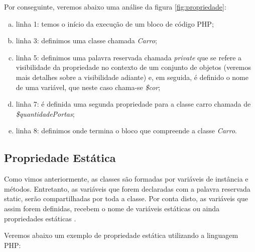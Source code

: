 Por conseguinte, veremos abaixo uma análise da figura \ref{fig:propriedade}:

\begin{enumerate}[a)]
    \item linha 1: temos o início da execução de um bloco de código PHP;
    \item linha 3: definimos uma classe chamada \textit{Carro};
    \item linha 5: definimos uma palavra reservada chamada
    \textit{private} que se refere a visibilidade da propriedade no contexto  de
    um conjunto de objetos (veremos mais detalhes sobre a visibilidade adiante) 
    e, em seguida, é definido o nome de uma variável, que neste caso chama-se
    \textit{\$cor};
    \item linha 7: é definida uma segunda propriedade para a classe
    carro chamada de \textit{\$quantidadePortas};
    \item linha 8: definimos onde termina o bloco que compreende a
    classe \textit{Carro}.
\end{enumerate}

\subsection{Propriedade Estática}

Como vimos anteriormente, as classes são formadas por variáveis de instância e
métodos. Entretanto, as variáveis que forem declaradas com a palavra reservada 
static, serão compartilhadas por toda a classe. Por conta disto, as variáveis 
que assim forem definidas, recebem o nome de variáveis estáticas ou ainda 
propriedades estáticas \cite{learningJava}.

Veremos abaixo um exemplo de propriedade estática utilizando a linguagem PHP:
